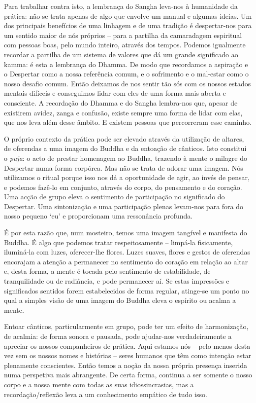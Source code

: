 Para trabalhar contra isto, a lembrança do Sangha leva-nos à humanidade da prática: não se trata apenas de algo que envolve um manual e algumas ideias. Um dos principais benefícios de uma linhagem e de uma tradição é despertar-nos para um sentido maior de nós próprios -- para a partilha da camaradagem espiritual com pessoas boas, pelo mundo inteiro, através dos tempos. Podemos igualmente recordar a partilha de um sistema de valores que dá um grande significado ao kamma: é esta a lembrança do Dhamma. De modo que recordamos a aspiração e o Despertar como a nossa referência comum, e o sofrimento e o mal-estar como o nosso desafio comum. Então deixamos de nos sentir tão sós com os nossos estados mentais difíceis e conseguimos lidar com eles de uma forma mais aberta e consciente. A recordação do Dhamma e do Sangha lembra-nos que, apesar de existirem avidez, zanga e confusão, existe sempre uma forma de lidar com elas, que nos leva além desse âmbito. E existem pessoas que percorreram esse caminho.

O próprio contexto da prática pode ser elevado através da utilização de altares, de oferendas a uma imagem do Buddha e da entoação de cânticos. Isto constitui o \emph{puja}: o acto de prestar homenagem ao Buddha, trazendo à mente o milagre do Despertar numa forma corpórea. Mas não se trata de adorar uma imagem. Nós utilizamos o ritual porque isso nos dá a oportunidade de agir, ao invés de pensar, e podemos fazê-lo em conjunto, através do corpo, do pensamento e do coração. Uma acção de grupo eleva o sentimento de participação no significado do Despertar. Uma sintonização e uma participação plenas levam-nos para fora do nosso pequeno `eu' e proporcionam uma ressonância profunda.

É por esta razão que, num mosteiro, temos uma imagem tangível e manifesta do Buddha. É algo que podemos tratar respeitosamente -- limpá-la fisicamente, iluminá-la com luzes, oferecer-lhe flores. Luzes suaves, flores e gestos de oferendas encorajam a atenção a permanecer no sentimento do coração em relação ao altar e, desta forma, a mente é tocada pelo sentimento de estabilidade, de tranquilidade ou de radiância, e pode permanecer aí. Se estas impressões e significados sentidos forem estabelecidos de forma regular, atinge-se um ponto no qual a simples visão de uma imagem do Buddha eleva o espírito ou acalma a mente.

Entoar cânticos, particularmente em grupo, pode ter um efeito de harmonização, de acalmia: de forma sonora e pausada, pode ajudar-nos verdadeiramente a apreciar os nossos companheiros de prática. Aqui estamos nós -- pelo menos desta vez sem os nossos nomes e histórias -- seres humanos que têm como intenção estar plenamente conscientes. Então temos a noção da nossa própria presença inserida numa perspetiva mais abrangente. De certa forma, continua a ser somente o nosso corpo e a nossa mente com todas as suas idiossincrasias, mas a recordação/reflexão leva a um conhecimento empático de tudo isso.


